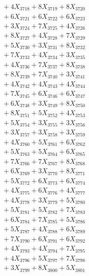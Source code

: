 \documentclass[a4paper,10pt]{article}
\begin{document}
{\begin{align}
&\;  + 4 X_{3718} + 8 X_{3719} + 8 X_{3720} \\[0.3ex]
&\;  + 6 X_{3721} + 6 X_{3722} + 6 X_{3723} \\[0.3ex]
&\;  + 3 X_{3724} + 7 X_{3725} + 4 X_{3726} \\[0.3ex]
&\;  + 8 X_{3727} + 4 X_{3728} + 7 X_{3729} \\[0.5ex]\allowbreak
&\;  + 5 X_{3730} + 3 X_{3731} + 8 X_{3732} \\[0.3ex]
&\;  + 7 X_{3733} + 4 X_{3734} + 3 X_{3735} \\[0.3ex]
&\;  + 4 X_{3736} + 7 X_{3737} + 8 X_{3738} \\[0.3ex]
&\;  + 8 X_{3739} + 7 X_{3740} + 3 X_{3741} \\[0.3ex]
&\;  + 4 X_{3742} + 4 X_{3743} + 4 X_{3744} \\[0.3ex]
&\;  + 7 X_{3745} + 6 X_{3746} + 6 X_{3747} \\[0.3ex]
&\;  + 6 X_{3748} + 3 X_{3749} + 8 X_{3750} \\[0.3ex]
&\;  + 8 X_{3751} + 5 X_{3752} + 4 X_{3753} \\[0.3ex]
&\;  + 5 X_{3754} + 3 X_{3755} + 3 X_{3756} \\[0.3ex]
&\;  + 3 X_{3757} + 3 X_{3758} + 3 X_{3759} \\[0.5ex]\allowbreak
&\;  + 4 X_{3760} + 5 X_{3761} + 6 X_{3762} \\[0.3ex]
&\;  + 5 X_{3763} + 5 X_{3764} + 6 X_{3765} \\[0.3ex]
&\;  + 7 X_{3766} + 7 X_{3767} + 8 X_{3768} \\[0.3ex]
&\;  + 6 X_{3769} + 3 X_{3770} + 8 X_{3771} \\[0.3ex]
&\;  + 5 X_{3772} + 6 X_{3773} + 6 X_{3774} \\[0.3ex]
&\;  + 4 X_{3775} + 6 X_{3776} + 4 X_{3777} \\[0.3ex]
&\;  + 4 X_{3778} + 3 X_{3779} + 5 X_{3780} \\[0.3ex]
&\;  + 5 X_{3781} + 5 X_{3782} + 7 X_{3783} \\[0.3ex]
&\;  + 6 X_{3784} + 7 X_{3785} + 5 X_{3786} \\[0.3ex]
&\;  + 5 X_{3787} + 4 X_{3788} + 6 X_{3789} \\[0.5ex]\allowbreak
&\;  + 7 X_{3790} + 6 X_{3791} + 6 X_{3792} \\[0.3ex]
&\;  + 4 X_{3793} + 4 X_{3794} + 7 X_{3795} \\[0.3ex]
&\;  + 4 X_{3796} + 5 X_{3797} + 7 X_{3798} \\[0.3ex]
&\;  + 3 X_{3799} + 8 X_{3800} + 5 X_{3801} \\[0.3ex]

\end{align}}
\end{document}
